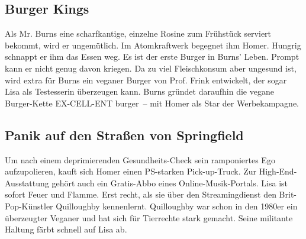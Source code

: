 
\subsection{Burger Kings}\label{QABF11}
Als Mr. Burns eine scharfkantige, einzelne Rosine zum Frühstück serviert bekommt, wird er ungemütlich. Im Atomkraftwerk begegnet ihm Homer. Hungrig schnappt er ihm das Essen weg. Es ist der erste Burger in Burns' Leben. Prompt kann er nicht genug davon kriegen. Da zu viel Fleischkonsum aber ungesund ist, wird extra für Burns ein veganer Burger von Prof. Frink entwickelt, der sogar Lisa als Testesserin überzeugen kann. Burns gründet daraufhin die vegane Burger-Kette \glqq EX-CELL-ENT burger\grqq\ -- mit Homer als Star der Werbekampagne.


\subsection{Panik auf den Straßen von Springfield}
Um nach einem deprimierenden Gesundheits-Check sein ramponiertes Ego aufzupolieren, kauft sich Homer einen PS-starken Pick-up-Truck. Zur High-End-Ausstattung gehört auch ein Gratis-Abbo eines Online-Musik-Portals. Lisa ist sofort Feuer und Flamme. Erst recht, als sie über den Streamingdienst den Brit-Pop-Künstler Quilloughby kennenlernt. Quilloughby war schon in den 1980er ein überzeugter Veganer und hat sich für Tierrechte stark gemacht. Seine militante Haltung färbt schnell auf Lisa ab.


